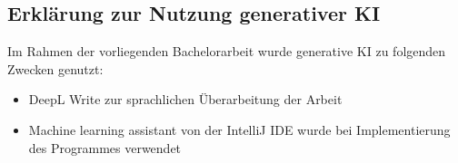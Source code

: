 \begin{otherlanguage}{ngerman}

\section*{Erklärung zur Nutzung generativer KI}

Im Rahmen der vorliegenden Bachelorarbeit wurde generative KI zu folgenden Zwecken genutzt:


\begin{itemize}
\item DeepL Write zur sprachlichen Überarbeitung der Arbeit
\item Machine learning assistant von der IntelliJ IDE wurde bei Implementierung des Programmes verwendet
\end{itemize}

\end{otherlanguage}